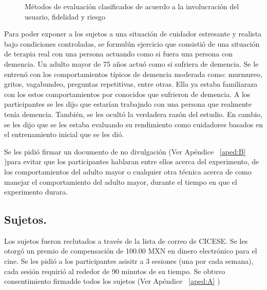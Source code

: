 \begin{figure}[h]
        \centering
        \caption{M\'etodos de evaluaci\'on clasificados de acuerdo a la involucraci\'on del usuario, fidelidad y riesgo}\label{fig:evalmethods}
\end{figure}


Para poder exponer a los sujetos a una situaci\'on de cuidador estresante y realista bajo condiciones controladas, se formul\' un ejercicio que consisti\'o de una situaci\'on de terapia real con una persona actuando como si fuera una persona con demencia. Un adulto mayor de 75 a\~nos actu\'o como si sufriera de demencia. Se le entren\'o con los comportamientos t\'ipicos de demencia moderada como: murmureo, gritos, vagabundeo, preguntas repetitivas, entre otras. Ella ya estaba familiaraza con los estos comportamientos por conocidos que sufrieron de demencia. A los participantes se les dijo que estar\'ian trabajndo con una persona que realmente ten\'ia demencia. Tambi\'en, se les ocult\'o la verdadera raz\'on del estudio. En cambio, se les dijo que se les estaba evaluando su rendimiento como cuidadores basados en el entrenamiento inicial que se les di\'o.

Se les pidi\'o firmar un documento de no divulgaci\'on (Ver Ap\'endice ~\ref{aped:B} )para evitar que los participantes hablaran entre ellos acerca del experimento, de los comportamientos del adulto mayor o cualquier otra t\'ecnica acerca de como manejar el comportamiento del adulto mayor, durante el tiempo en que el experimento durara.

\subsection{Sujetos.}\label{secc:subjects}
Los sujetos fueron reclutados a trav\'es de la lista de correo de CICESE. Se les otorg\'o un premio de compensaci\'on de 100.00 MXN en dinero electr\'onico para el cine. Se les pidi\'o a los participantes asisitr a 3 sesiones (una por cada semana), cada sesi\'on requiri\'o al rededor de 90 minutos de su tiempo. Se obtuvo consentimiento firmadde todos los sujetos (Ver Ap\'endice ~\ref{aped:A} )

